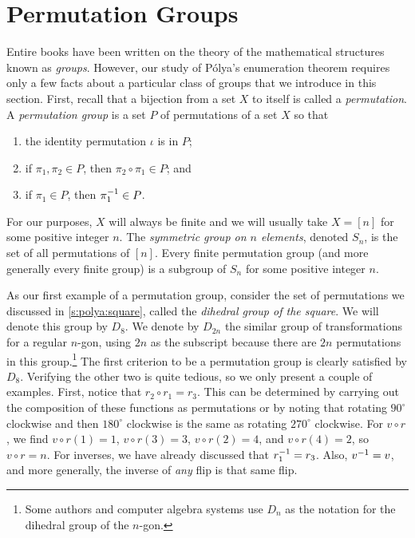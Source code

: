 \section{Permutation Groups}\label{s:polya:perm-groups}

Entire books have been written on the theory of the mathematical
structures known as \emph{groups}. However, our study of P\'olya's
enumeration theorem requires only a few facts about a particular class
of groups that we introduce in this section. First, recall that a
bijection from a set $X$ to itself is called a \emph{permutation}. A
\emph{permutation group} is a set $P$ of permutations of a set $X$ so
that
\begin{enumerate}
\item the identity permutation $\iota$ is in $P$;
\item if $\pi_1,\pi_2\in P$, then $\pi_2\circ \pi_1\in P$; and
\item if $\pi_1\in P$, then $\pi_1^{-1}\in P$.
\end{enumerate}
For our purposes, $X$ will always be finite and we will usually take
$X=[n]$ for some positive integer $n$. The \emph{symmetric group on
  $n$ elements}, denoted $S_n$, is the set of all permutations of
$[n]$. Every finite permutation group (and more generally every finite
group) is a subgroup of $S_n$ for some positive integer $n$.

As our first example of a permutation group, consider the set of
permutations we discussed in \autoref{s:polya:square}, called the
\emph{dihedral group of the square}. We will denote this group by
$D_8$. We denote by $D_{2n}$ the similar group of transformations for
a regular $n$-gon, using $2n$ as the subscript because there are $2n$
permutations in this group.\footnote{Some authors and computer algebra
  systems use $D_n$ as the notation for the dihedral group of the
  $n$-gon.} The first criterion to be a permutation group is clearly
satisfied by $D_8$. Verifying the other two is quite tedious, so we
only present a couple of examples. First, notice that $r_2\circ
r_1=r_3$. This can be determined by carrying out the composition of
these functions as permutations or by noting that rotating $90^\circ$
clockwise and then $180^\circ$ clockwise is the same as rotating
$270^\circ$ clockwise. For $v\circ r$, we find $v\circ r(1) = 1$,
$v\circ r(3)=3$, $v\circ r(2)=4$, and $v\circ r(4)=2$, so $v\circ
r=n$. For inverses, we have already discussed that $r_1^{-1} =
r_3$. Also, $v^{-1} = v$, and more generally, the inverse of \emph{any}
flip is that same flip.

